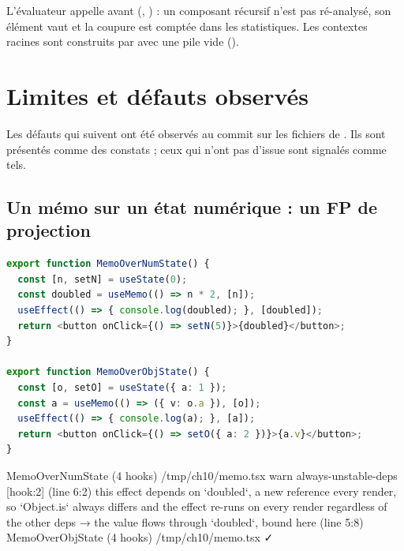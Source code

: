 L'évaluateur appelle  avant 
(,
) : un composant récursif
n'est pas ré-analysé, son élément vaut  et la coupure est
comptée dans les statistiques. Les contextes racines sont construits par
 avec une pile vide
().

\section{Limites et défauts observés}
\label{sec:statevalue-stabilite-limites}

Les défauts qui suivent ont été observés au commit \snapshotCommit{} sur
les fichiers de . Ils sont présentés comme des constats ;
ceux qui n'ont pas d'issue sont signalés comme tels.

\subsection{Un mémo sur un état numérique : un FP de projection}

\begin{lstlisting}[language=TypeScript,caption={Deux mémos sur un état (\file{/tmp/ch10/memo.tsx}, extrait)},label={lst:statevalue-stabilite-memonum}]
export function MemoOverNumState() {
  const [n, setN] = useState(0);
  const doubled = useMemo(() => n * 2, [n]);
  useEffect(() => { console.log(doubled); }, [doubled]);
  return <button onClick={() => setN(5)}>{doubled}</button>;
}

export function MemoOverObjState() {
  const [o, setO] = useState({ a: 1 });
  const a = useMemo(() => ({ v: o.a }), [o]);
  useEffect(() => { console.log(a); }, [a]);
  return <button onClick={() => setO({ a: 2 })}>{a.v}</button>;
}
\end{lstlisting}

\begin{sortie}
  MemoOverNumState  (4 hooks)  /tmp/ch10/memo.tsx
    warn   always-unstable-deps  [hook:2]  (line 6:2)  this effect depends on `doubled`, a new reference every render, so `Object.is` always differs and the effect re-runs on every render regardless of the other deps
       → the value flows through `doubled`, bound here (line 5:8)
  MemoOverObjState  (4 hooks)  /tmp/ch10/memo.tsx  ✓
\end{sortie}

